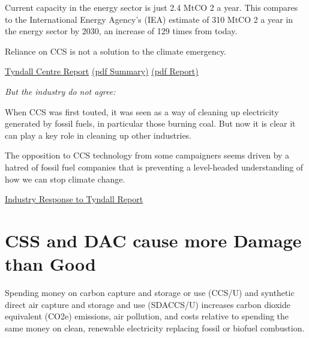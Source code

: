 \documentclass[
]{book}
\begin{document}
Current capacity in the energy sector is just 2.4 MtCO 2 a year.
This compares to the International Energy Agency's (IEA) estimate of 310 MtCO 2 a year in the
energy sector by 2030, an increase of 129 times from today.

Reliance on CCS is not a solution to the climate emergency.

\href{https://foe.scot/resource/report-carbon-capture-storage-energy-role/}{Tyndall Centre Report}
\href{pdf/Tyndall_2020_CCS-Summary.pdf}{(pdf Summary)}
\href{pdf/Tyndall_2020_CCS-Report.pdf}{(pdf Report)}

\emph{But the industry do not agree:}

When CCS was first touted, it was seen as a way of cleaning up
electricity generated by fossil fuels, in particular those burning coal.
But now it is clear it can play a key role in cleaning up other industries.

The opposition to CCS technology from some campaigners seems
driven by a hatred of fossil fuel companies that is
preventing a level-headed understanding of how we can stop climate change.

\href{https://www.theguardian.com/environment/2021/jan/16/carbon-capture-vital-meeting-climate-goals-scientists-cut-emissions}{Industry Response to Tyndall Report}

\hypertarget{css-and-dac-cause-more-damage-than-good}{%
\section{CSS and DAC cause more Damage than Good}\label{css-and-dac-cause-more-damage-than-good}}

Spending money on carbon capture and storage or use (CCS/U) and synthetic direct air capture and storage and use (SDACCS/U) increases carbon dioxide equivalent (CO2e) emissions, air pollution, and costs relative to spending the same money on clean, renewable electricity replacing fossil or biofuel combustion.
\end{document}
